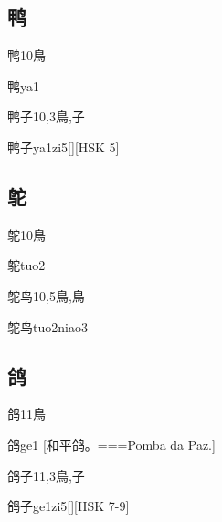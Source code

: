 \subsection*{鸭}

\begin{Entry}{鸭}{10}{⿃}
  \begin{Phonetics}{鸭}{ya1}
  \end{Phonetics}
\end{Entry}

\begin{Entry}{鸭子}{10,3}{⿃,⼦}
  \begin{Phonetics}{鸭子}{ya1zi5}[][HSK 5]
  \end{Phonetics}
\end{Entry}

\subsection*{鸵}

\begin{Entry}{鸵}{10}{⿃}
  \begin{Phonetics}{鸵}{tuo2}
  \end{Phonetics}
\end{Entry}

\begin{Entry}{鸵鸟}{10,5}{⿃,⿃}
  \begin{Phonetics}{鸵鸟}{tuo2niao3}
  \end{Phonetics}
\end{Entry}

\subsection*{鸽}

\begin{Entry}{鸽}{11}{⿃}
  \begin{Phonetics}{鸽}{ge1}
    [和平鸽。===Pomba da Paz.]
  \end{Phonetics}
\end{Entry}

\begin{Entry}{鸽子}{11,3}{⿃,⼦}
  \begin{Phonetics}{鸽子}{ge1zi5}[][HSK 7-9]
  \end{Phonetics}
\end{Entry}

